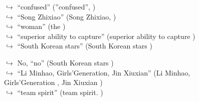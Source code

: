 \documentclass[11pt,a4paper, onecolumn]{article}
\begin{document}
\begin{figure}[t]
\begin{tcolorbox}[boxsep=0pt,left=5pt,right=0pt,top=2pt,colback = yellow!5]
\begin{dialogue}
\colorbox{pink!25}{$\hookrightarrow$}
{ ``confused'' (''confused'', ) }
\\
\colorbox{pink!25}{$\hookrightarrow$}
{ ``Song Zhixiao'' (Song Zhixiao, ) }
\\
\colorbox{pink!25}{$\hookrightarrow$}
{ ``woman'' (the ) }
\\
\colorbox{pink!25}{$\hookrightarrow$}
{ ``superior ability to capture'' (superior ability to capture ) }
\\
\colorbox{pink!25}{$\hookrightarrow$}
{ ``South Korean stars'' (South Korean stars ) }
 \end{dialogue}\end{tcolorbox}\end{figure}\begin{figure}[t] \small \begin{tcolorbox}[boxsep=0pt,left=5pt,right=0pt,top=2pt,colback = yellow!5] \begin{dialogue}
 \small 
\colorbox{pink!25}{$\hookrightarrow$}
\colorbox{red!25}{No,}
{ ``no'' (South Korean stars ) }
\\
\colorbox{pink!25}{$\hookrightarrow$}
{ ``Li Minhao, Girls'Generation, Jin Xiuxian'' (Li Minhao, Girls'Generation , Jin Xiuxian ) }
\\
\colorbox{pink!25}{$\hookrightarrow$}
{ ``team spirit'' (team spirit. ) }
\\
 \end{dialogue}\end{tcolorbox}\end{figure}
\end{document}
